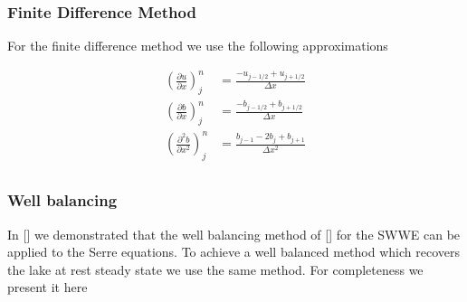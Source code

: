\subsubsection{Finite Difference Method}
For the finite difference method we use the following approximations

\begin{align*}
\left( \frac{\partial {u}}{\partial x} \right)^n_j &  = \frac{-u_{j-1/2} +   u_{j+1/2}}{\Delta x} \\
\left( \frac{\partial b}{\partial x} \right)^n_j &  = \frac{-b_{j-1/2} + b_{j+1/2}}{\Delta x}  \\
\left( \frac{\partial^2 b}{\partial x^2} \right)^n_j & = \frac{b_{j-1} - 2b_{j} + b_{j+1}}{\Delta x^2} \\
\end{align*}

\subsubsection{Well balancing}
In [] we demonstrated that the well balancing method of [] for the SWWE can be applied to the Serre equations. To achieve a well balanced method which recovers the lake at rest steady state we use the same method. For completeness we present it here

